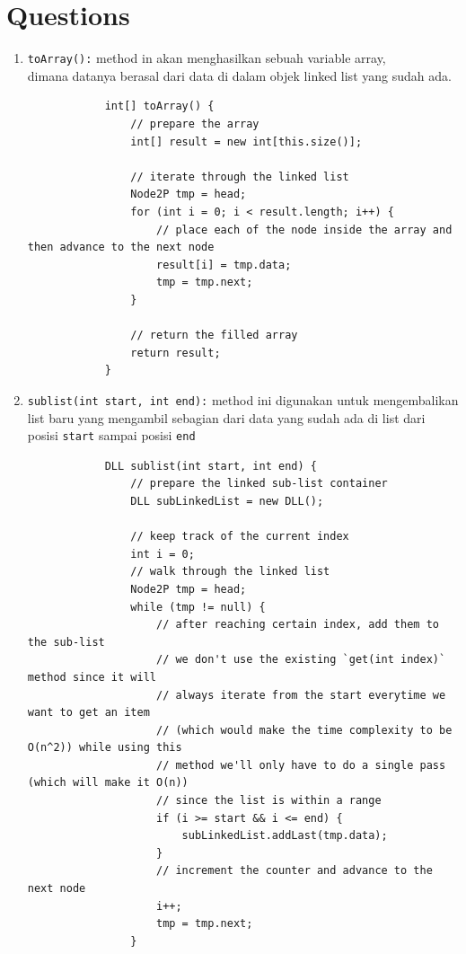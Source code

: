 \documentclass[12pt,titlepage]{article}
\begin{document}
\section{Questions}
\begin{enumerate}[label=\alph*)]
    \item {
        \texttt{toArray():} method in akan menghasilkan sebuah variable array,\\
        dimana datanya berasal dari data di dalam objek linked list yang sudah ada.

        \begin{verbatim}
            int[] toArray() {
                // prepare the array
                int[] result = new int[this.size()];

                // iterate through the linked list
                Node2P tmp = head;
                for (int i = 0; i < result.length; i++) {
                    // place each of the node inside the array and then advance to the next node
                    result[i] = tmp.data;
                    tmp = tmp.next;
                }

                // return the filled array
                return result;
            }
        \end{verbatim}
    }
    \item {
        \texttt{sublist(int start, int end):} method ini digunakan untuk mengembalikan list baru
        yang mengambil sebagian dari data yang sudah ada di list dari posisi \texttt{start} sampai posisi \texttt{end}

        \begin{verbatim}
            DLL sublist(int start, int end) {
                // prepare the linked sub-list container
                DLL subLinkedList = new DLL();

                // keep track of the current index
                int i = 0;
                // walk through the linked list
                Node2P tmp = head;
                while (tmp != null) {
                    // after reaching certain index, add them to the sub-list
                    // we don't use the existing `get(int index)` method since it will
                    // always iterate from the start everytime we want to get an item
                    // (which would make the time complexity to be O(n^2)) while using this
                    // method we'll only have to do a single pass (which will make it O(n))
                    // since the list is within a range
                    if (i >= start && i <= end) {
                        subLinkedList.addLast(tmp.data);
                    }
                    // increment the counter and advance to the next node
                    i++;
                    tmp = tmp.next;
                }


\end{verbatim}}
\end{enumerate}
\end{document}

